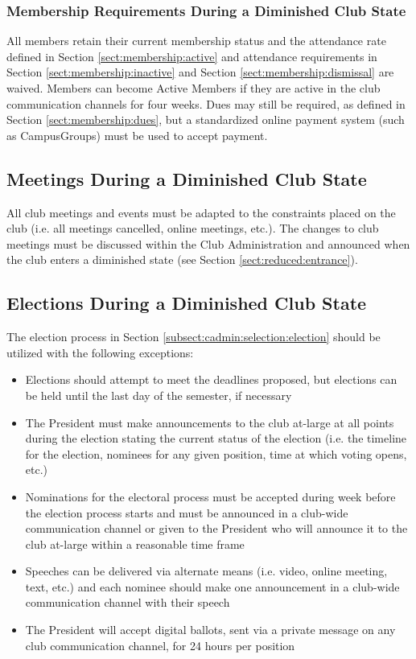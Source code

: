 \documentclass[english,11pt]{article}
\begin{document}
\subsubsection{Membership Requirements During a Diminished Club State} \label{subsect:reduced:membership}
All members retain their current membership status and the attendance rate defined in Section \ref{sect:membership:active} and attendance requirements in Section \ref{sect:membership:inactive} and Section \ref{sect:membership:dismissal} are waived.
Members can become Active Members if they are active in the club communication channels for four weeks.
Dues may still be required, as defined in Section \ref{sect:membership:dues}, but a standardized online payment system (such as CampusGroups) must be used to accept payment.

\subsection{Meetings During a Diminished Club State} \label{subsect:reduced:meetings}
All club meetings and events must be adapted to the constraints placed on the club (i.e. all meetings cancelled, online meetings, etc.).
The changes to club meetings must be discussed within the Club Administration and announced when the club enters a diminished state (see Section \ref{sect:reduced:entrance}).

\subsection{Elections During a Diminished Club State} \label{subsect:reduced:cadmin}
The election process in Section \ref{subsect:cadmin:selection:election} should be utilized with the following exceptions:

\begin{itemize}
    \item Elections should attempt to meet the deadlines proposed, but elections can be held until the last day of the semester, if necessary
    \item The President must make announcements to the club at-large at all points during the election stating the current status of the election (i.e. the timeline for the election, nominees for any given position, time at which voting opens, etc.)
    \item Nominations for the electoral process must be accepted during week before the election process starts and must be announced in a club-wide communication channel or given to the President who will announce it to the club at-large within a reasonable time frame
    \item Speeches can be delivered via alternate means (i.e. video, online meeting, text, etc.) and each nominee should make one announcement in a club-wide communication channel with their speech 
    \item The President will accept digital ballots, sent via a private message on any club communication channel, for 24 hours per position
\end{itemize}
\end{document}
